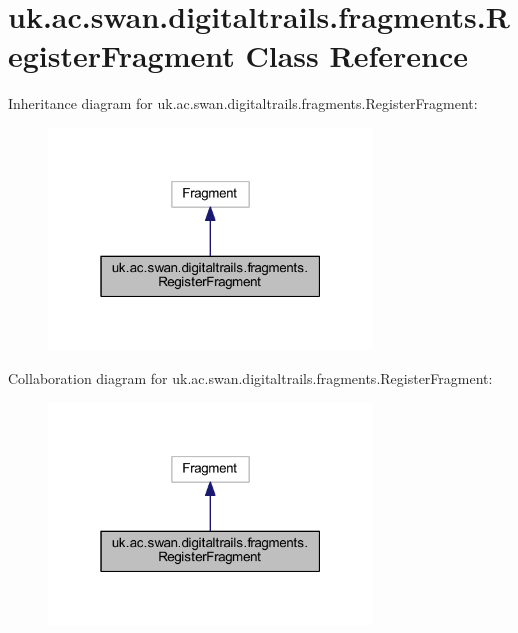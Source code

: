 \hypertarget{classuk_1_1ac_1_1swan_1_1digitaltrails_1_1fragments_1_1_register_fragment}{\section{uk.\+ac.\+swan.\+digitaltrails.\+fragments.\+Register\+Fragment Class Reference}
\label{classuk_1_1ac_1_1swan_1_1digitaltrails_1_1fragments_1_1_register_fragment}
}


Inheritance diagram for uk.\+ac.\+swan.\+digitaltrails.\+fragments.\+Register\+Fragment\+:\nopagebreak
\begin{figure}[H]
\begin{center}
\leavevmode
\includegraphics[width=244pt]{classuk_1_1ac_1_1swan_1_1digitaltrails_1_1fragments_1_1_register_fragment__inherit__graph}
\end{center}
\end{figure}


Collaboration diagram for uk.\+ac.\+swan.\+digitaltrails.\+fragments.\+Register\+Fragment\+:\nopagebreak
\begin{figure}[H]
\begin{center}
\leavevmode
\includegraphics[width=244pt]{classuk_1_1ac_1_1swan_1_1digitaltrails_1_1fragments_1_1_register_fragment__coll__graph}
\end{center}
\end{figure}
